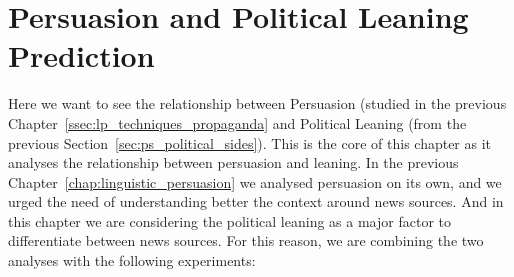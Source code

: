 

\section{\statusorange Persuasion and Political Leaning Prediction}
\label{sec:ps_prop_and_leaning}

Here we want to see the relationship between Persuasion (studied in the previous Chapter~\ref{ssec:lp_techniques_propaganda} and Political Leaning (from the previous Section~\ref{sec:ps_political_sides}).
This is the core of this chapter as it analyses the relationship between persuasion and leaning. In the previous Chapter~\ref{chap:linguistic_persuasion} we analysed persuasion on its own, and we urged the need of understanding better the context around news sources. And in this chapter we are considering the political leaning as a major factor to differentiate between news sources.
For this reason, we are combining the two analyses with the following experiments:

